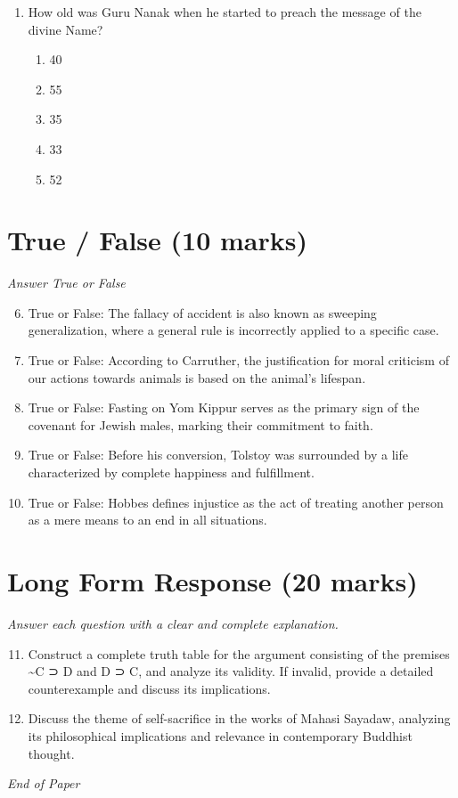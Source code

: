 \documentclass[12pt]{article}
\begin{document}
\begin{enumerate}[label=\arabic*.]
\begin{enumerate}[label=(\alph*)]
    \item they help develop human capabilities.
    \item they recognize, enforce, and implement duties not to violate human rights.
    \item they maximize the amount of happiness in the world.
\end{enumerate}
\item How old was Guru Nanak when he started to preach the message of the divine Name?
\begin{enumerate}[label=(\alph*)]
    \item 40
    \item 55
    \item 35
    \item 33
    \item 52
\end{enumerate}
\end{enumerate}

\section*{True / False (10 marks)}
\textit{Answer True or False}
\begin{enumerate}[label=\arabic*.]
\setcounter{enumi}{5}
\item True or False: The fallacy of accident is also known as sweeping generalization, where a general rule is incorrectly applied to a specific case.
\item True or False: According to Carruther, the justification for moral criticism of our actions towards animals is based on the animal's lifespan.
\item True or False: Fasting on Yom Kippur serves as the primary sign of the covenant for Jewish males, marking their commitment to faith.
\item True or False: Before his conversion, Tolstoy was surrounded by a life characterized by complete happiness and fulfillment.
\item True or False: Hobbes defines injustice as the act of treating another person as a mere means to an end in all situations.
\end{enumerate}

\section*{Long Form Response (20 marks)}
\textit{Answer each question with a clear and complete explanation.}
\begin{enumerate}[label=\arabic*.]
\setcounter{enumi}{10}
\item Construct a complete truth table for the argument consisting of the premises \textasciitilde{}C ⊃ D and D ⊃ C, and analyze its validity. If invalid, provide a detailed counterexample and discuss its implications.
\item Discuss the theme of self-sacrifice in the works of Mahasi Sayadaw, analyzing its philosophical implications and relevance in contemporary Buddhist thought.
\end{enumerate}

\vfill
\noindent\textit{End of Paper}
\end{document}
